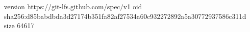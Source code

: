version https://git-lfs.github.com/spec/v1
oid sha256:d85babdbda3d27174b351fa82af27534a60c932272892a5a30772937586c311d
size 64617
